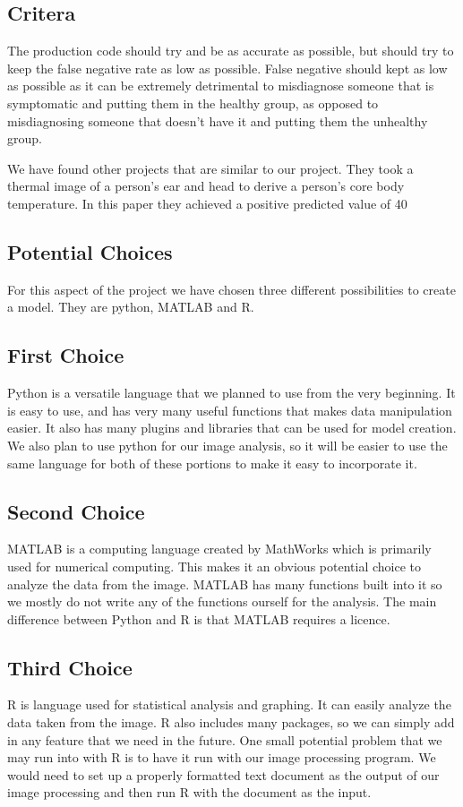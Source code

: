 \documentclass[10pt, draftclsnofoot, onecolumn]{IEEEtran}
\begin{document}
	\subsection{Critera}
	The production code should try and be as accurate as possible, but should try to keep the false negative rate as low as possible. False negative should kept as low as possible as it can be extremely detrimental to misdiagnose someone that is symptomatic and putting them in the healthy group, as opposed to misdiagnosing someone that doesn’t have it and putting them the unhealthy group.
	
	We have found other projects that are similar to our project. They took a thermal image of a person’s ear and head to derive a person’s core body temperature. In this paper they achieved a positive predicted value of 40%
	\subsection{Potential Choices}
	For this aspect of the project we have chosen three different possibilities to create a model. They are python, MATLAB and R.
	\subsection{First Choice}
	Python is a versatile language that we planned to use from the very beginning. It is easy to use, and has very many useful functions that makes data manipulation easier. It also has many plugins and libraries that can be used for model creation. We also plan to use python for our image analysis, so it will be easier to use the same language for both of these portions to make it easy to incorporate it.
	\subsection{Second Choice}
	MATLAB is a computing language created by MathWorks which is primarily used for numerical computing. This makes it an obvious potential choice to analyze the data from the image. MATLAB has many functions built into it so we mostly do not write any of the functions ourself for the analysis. The main difference between Python and R is that MATLAB requires a licence.
	\subsection{Third Choice}
	R is language used for statistical analysis and graphing. It can easily analyze the data taken from the image. R also includes many packages, so we can simply add in any feature that we need in the future. One small potential problem that we may run into with R is to have it run with our image processing program. We would need to set up a properly formatted text document as the output of our image processing and then run R with the document as the input.
\end{document}
